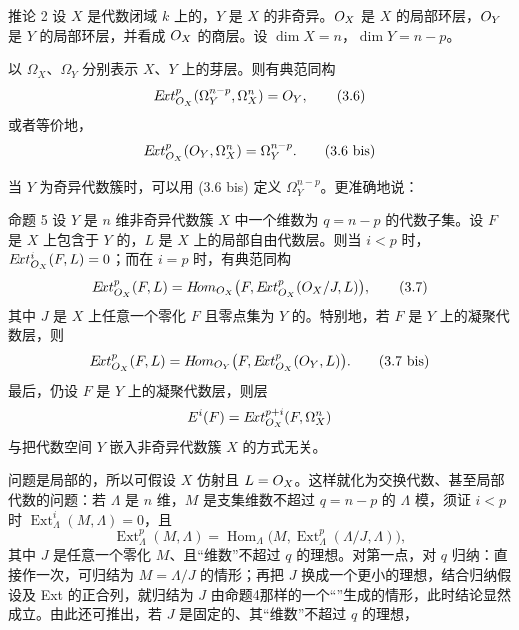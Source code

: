 \begin{statement}{推论 2}
设 $X$ 是代数闭域 $k$ 上的，$Y$ 是 $X$ 的非奇异。$O_X$ 是 $X$ 的局部环层，$O_Y$ 是 $Y$ 的局部环层，并看成 $O_X$ 的商层。设 $\dim X=n$，$\dim Y=n-p$。

以 $\Omega_X$、$\Omega_Y$ 分别表示 $X$、$Y$ 上的芽层。则有典范同构
\begin{equation}
E\!xt_{O_X}^{p}(\Omega_Y^{n-p},\Omega_X^n)=O_Y,
\tag{3.6}
\end{equation}
或者等价地，
\begin{equation}
E\!xt_{O_X}^{p}(O_Y,\Omega_X^n)=\Omega_Y^{n-p}.
\tag{3.6 bis}
\end{equation}
\end{statement}
当 $Y$ 为奇异代数簇时，可以用 (3.6 bis) 定义 $\Omega_Y^{n-p}$。更准确地说：
\begin{statement}{命题 5}
设 $Y$ 是 $n$ 维非奇异代数簇 $X$ 中一个维数为 $q=n-p$ 的代数子集。设 $F$ 是 $X$ 上包含于 $Y$ 的，$L$ 是 $X$ 上的局部自由代数层。则当 $i<p$ 时，$E\!xt_{O_X}^{i}(F,L)=0$；而在 $i=p$ 时，有典范同构
\begin{equation}
E\!xt_{O_X}^{p}(F,L)=
H\!om_{O_X}\bigl(F,E\!xt_{O_X}^{p}(O_X/J,L)\bigr),
\tag{3.7}
\end{equation}
其中 $J$ 是 $X$ 上任意一个零化 $F$ 且零点集为 $Y$ 的。特别地，若 $F$ 是 $Y$ 上的凝聚代数层，则
\begin{equation}
E\!xt_{O_X}^{p}(F,L)=
H\!om_{O_Y}\bigl(F,E\!xt_{O_X}^{p}(O_Y,L)\bigr).
\tag{3.7 bis}
\end{equation}
最后，仍设 $F$ 是 $Y$ 上的凝聚代数层，则层
\[
E^i(F)=E\!xt_{O_X}^{p+i}(F,\Omega_X^n)
\]
与把代数空间 $Y$ 嵌入非奇异代数簇 $X$ 的方式无关。
\end{statement}
问题是局部的，所以可假设 $X$ 仿射且 $L=O_X$。这样就化为交换代数、甚至局部代数的问题：若 $\Lambda$ 是 $n$ 维，$M$ 是支集维数不超过 $q=n-p$ 的 $\Lambda$ 模，须证 $i<p$ 时 $\operatorname{Ext}_{\Lambda}^{i}(M,\Lambda)=0$，且
\[
\operatorname{Ext}_{\Lambda}^{p}(M,\Lambda)
=\operatorname{Hom}_{\Lambda}\bigl(M,\operatorname{Ext}_{\Lambda}^{p}(\Lambda/J,\Lambda)\bigr),
\]
其中 $J$ 是任意一个零化 $M$、且“维数”不超过 $q$ 的理想。对第一点，对 $q$ 归纳：直接作一次，可归结为 $M=\Lambda/J$ 的情形；再把 $J$ 换成一个更小的理想，结合归纳假设及 Ext 的正合列，就归结为 $J$ 由命题4那样的一个“”生成的情形，此时结论显然成立。由此还可推出，若 $J$ 是固定的、其“维数”不超过 $q$ 的理想，

